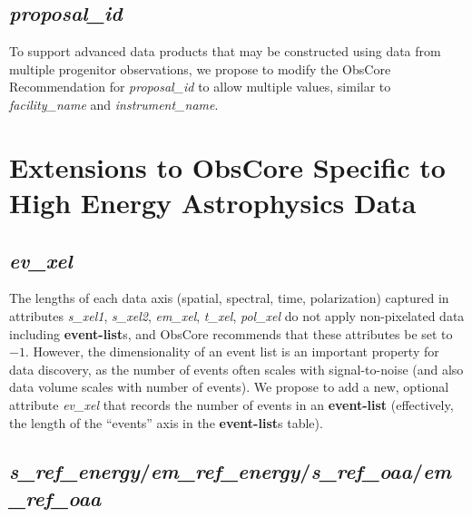 \documentclass[11pt,a4paper]{ivoa}
\begin{document}


\subsection{{\em proposal\_id}}

To support advanced data products that may be constructed using data from multiple progenitor observations, we propose to modify the ObsCore Recommendation for {\em proposal\_id\/} to allow multiple values, similar to {\em facility\_name\/} and {\em instrument\_name}.


\section{Extensions to ObsCore Specific to High Energy Astrophysics Data}
\label{sec:obscoreext}
\label{sec:voc}

\subsection{{\em ev\_xel}}

The lengths of each data axis (spatial, spectral, time, polarization) captured in attributes {\em s\_xel1\/}, {\em s\_xel2\/}, {\em em\_xel\/}, {\em t\_xel\/}, {\em pol\_xel\/} do not apply non-pixelated data including {\bf event-list}s, and ObsCore recommends that these attributes be set to $-1$.  However, the dimensionality of an event list is an important property for data discovery, as the number of events often scales with signal-to-noise (and also data volume scales with number of events).  We propose to add a new, optional attribute {\em ev\_xel\/} that records the number of events in an {\bf event-list} (effectively, the length of the ``events'' axis in the {\bf event-list}s table).

\subsection{{\em s\_ref\_energy\/}/{\em em\_ref\_energy\/}/{\em s\_ref\_oaa\/}/{\em em\_ref\_oaa}}
\end{document}
